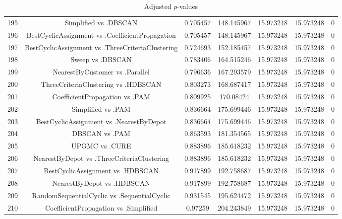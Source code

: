 \documentclass[a4paper,10pt]{article}
\begin{document}
\begin{landscape}
\begin{table}[!htp]
\begin{tabular}{ccccccc}
195&Simplified vs .DBSCAN&0.705457&148.145967&15.973248&15.973248&0\\
196&BestCyclicAssignment vs .CoefficientPropagation&0.705457&148.145967&15.973248&15.973248&0\\
197&BestCyclicAssignment vs .ThreeCriteriaClustering&0.724693&152.185457&15.973248&15.973248&0\\
198&Sweep vs .DBSCAN&0.783406&164.515246&15.973248&15.973248&0\\
199&NearestByCustomer vs .Parallel&0.796636&167.293579&15.973248&15.973248&0\\
200&ThreeCriteriaClustering vs .HDBSCAN&0.803273&168.687417&15.973248&15.973248&0\\
201&CoefficientPropagation vs .PAM&0.809925&170.08424&15.973248&15.973248&0\\
202&Simplified vs .PAM&0.836664&175.699446&15.973248&15.973248&0\\
203&BestCyclicAssignment vs .NearestByDepot&0.836664&175.699446&15.973248&15.973248&0\\
204&DBSCAN vs .PAM&0.863593&181.354565&15.973248&15.973248&0\\
205&UPGMC vs .CURE&0.883896&185.618232&15.973248&15.973248&0\\
206&NearestByDepot vs .ThreeCriteriaClustering&0.883896&185.618232&15.973248&15.973248&0\\
207&BestCyclicAssignment vs .HDBSCAN&0.917899&192.758687&15.973248&15.973248&0\\
208&NearestByDepot vs .HDBSCAN&0.917899&192.758687&15.973248&15.973248&0\\
209&RandomSequentialCyclic vs .SequentialCyclic&0.931545&195.624472&15.973248&15.973248&0\\
210&CoefficientPropagation vs .Simplified&0.97259&204.243849&15.973248&15.973248&0\\
\hline
\end{tabular}
\caption{Adjusted $p$-values}
\end{table}

\end{landscape}
\end{document}

